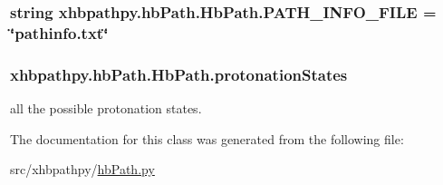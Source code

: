 \hypertarget{classxhbpathpy_1_1hb_path_1_1_hb_path_aad2661f44ffc401393a1e8f017ffdb61}{
\subsubsection[{P\-A\-T\-H\-\_\-\-I\-N\-F\-O\-\_\-\-F\-I\-L\-E}]{\setlength{\rightskip}{0pt plus 5cm}string xhbpathpy.\-hb\-Path.\-Hb\-Path.\-P\-A\-T\-H\-\_\-\-I\-N\-F\-O\-\_\-\-F\-I\-L\-E = \char`\"{}pathinfo.\-txt\char`\"{}\hspace{0.3cm}{\ttfamily [static]}}}\label{classxhbpathpy_1_1hb_path_1_1_hb_path_aad2661f44ffc401393a1e8f017ffdb61}
\hypertarget{classxhbpathpy_1_1hb_path_1_1_hb_path_aac00fb2999e064916005328fd4032763}{
\subsubsection[{protonation\-States}]{\setlength{\rightskip}{0pt plus 5cm}xhbpathpy.\-hb\-Path.\-Hb\-Path.\-protonation\-States}}\label{classxhbpathpy_1_1hb_path_1_1_hb_path_aac00fb2999e064916005328fd4032763}


all the possible protonation states. 



The documentation for this class was generated from the following file\-:\begin{DoxyCompactItemize}
\item 
src/xhbpathpy/\hyperlink{hb_path_8py}{hb\-Path.\-py}\end{DoxyCompactItemize}
